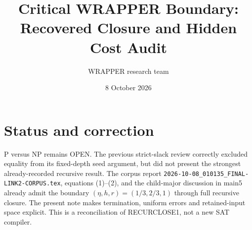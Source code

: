 \documentclass[11pt]{article}
\title{Critical WRAPPER Boundary: Recovered Closure and Hidden Cost Audit}
\author{WRAPPER research team}
\date{8 October 2026}
\begin{document}
\maketitle
\section{Status and correction}
P versus NP remains OPEN. The previous strict-slack review correctly
excluded equality from its fixed-depth seed argument, but did not present
the strongest already-recorded recursive result. The corpus report
\texttt{2026-10-08\_010135\_FINAL-LINK2-CORPUS.tex}, equations (1)--(2),
and the child-major discussion in main5 already admit the boundary
$(\eta,h,r)=(1/3,2/3,1)$ through full recursive closure. The present note
makes termination, uniform errors and retained-input space explicit.
This is a reconciliation of RECURCLOSE1, not a new SAT compiler.
\end{document}
